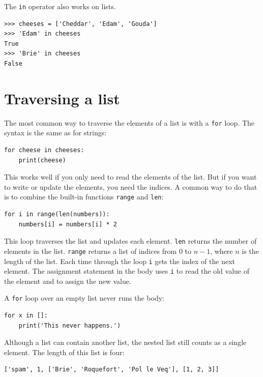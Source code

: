 \documentclass[10pt]{book}
\begin{document}

The {\tt in} operator also works on lists.

\begin{verbatim}
>>> cheeses = ['Cheddar', 'Edam', 'Gouda']
>>> 'Edam' in cheeses
True
>>> 'Brie' in cheeses
False
\end{verbatim}


\section{Traversing a list}

The most common way to traverse the elements of a list is
with a {\tt for} loop.  The syntax is the same as for strings:

\begin{verbatim}
for cheese in cheeses:
    print(cheese)
\end{verbatim}
%
This works well if you only need to read the elements of the
list.  But if you want to write or update the elements, you
need the indices.  A common way to do that is to combine
the built-in functions {\tt range} and {\tt len}:

\begin{verbatim}
for i in range(len(numbers)):
    numbers[i] = numbers[i] * 2
\end{verbatim}
%
This loop traverses the list and updates each element.  {\tt len}
returns the number of elements in the list.  {\tt range} returns
a list of indices from 0 to $n-1$, where $n$ is the length of
the list.  Each time through the loop {\tt i} gets the index
of the next element.  The assignment statement in the body uses
{\tt i} to read the old value of the element and to assign the
new value.

A {\tt for} loop over an empty list never runs the body:

\begin{verbatim}
for x in []:
    print('This never happens.')
\end{verbatim}
%
Although a list can contain another list, the nested
list still counts as a single element.  The length of this list is
four:

\begin{verbatim}
['spam', 1, ['Brie', 'Roquefort', 'Pol le Veq'], [1, 2, 3]]
\end{verbatim}
\end{document}
